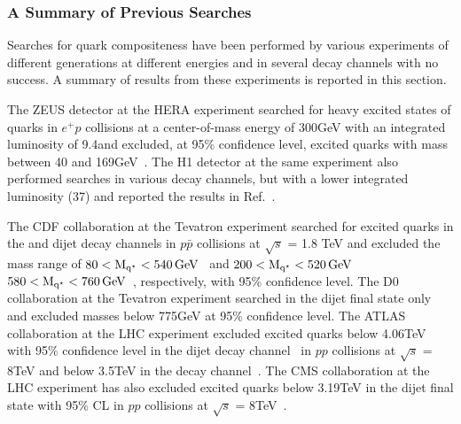 \subsubsection{A Summary of Previous Searches}
Searches for quark compositeness have been performed by various experiments of different generations at different energies
and in several decay channels with no success. A summary of results from these experiments is reported in this section.

The ZEUS detector at the \gls{HERA} experiment searched for heavy excited states of quarks in $e^{+}p$ collisions at a center-of-mass
energy of 300\unit{GeV} with an integrated luminosity of 9.4\pbinv and excluded, at 95\% confidence level, excited quarks with mass between 40 
and 169\unit{GeV}~\cite{Breitweg:1997qa}. The H1 detector at the same experiment also performed searches in various decay channels, but with a 
lower integrated luminosity (37\pbinv) and reported the results in Ref.~\cite{Tome:966798}. 

The CDF collaboration at the Tevatron experiment searched for excited quarks in the \gamjet and dijet decay channels 
in $p\bar{p}$ collisions at $\sqrt{s}$ = 1.8 TeV and excluded the mass range of $80<\mathrm{M_{q^\star}}<540\mathrm{\,GeV}$~\cite{CDFexclgj}
and $200<\mathrm{M_{q^\star}}<520\mathrm{\,GeV}$ \nd $580<\mathrm{M_{q^\star}}<760\mathrm{\,GeV}$~\cite{CDFexcljj}, respectively, with 95\% confidence level.
The D0 collaboration at the Tevatron experiment searched in the dijet final state only~\cite{D0excl} and excluded masses 
 below 775\unit{GeV} at 95\% confidence level. The ATLAS collaboration at the LHC experiment excluded excited 
quarks below 4.06\unit{TeV} with 95\% confidence level in the dijet decay channel~\cite{Aad:2014aqa} in $pp$ collisions at 
$\sqrt{s}$ = 8\unit{TeV} and below 3.5\unit{TeV} in the \gamjet decay channel~\cite{Aad:2013cva}.
The CMS collaboration at the LHC experiment has also excluded excited quarks below 3.19\unit{TeV} in the dijet final state with 95\% CL 
in $pp$ collisions at $\sqrt{s}$ = 8\unit{TeV}~\cite{CMSexcl8jj}. 
